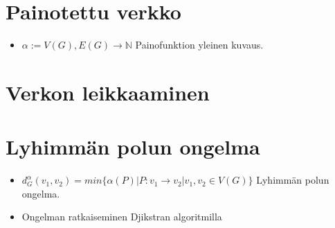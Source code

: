 \begin{itemize}
  \end{itemize}

\section{Painotettu verkko} \label{ch:09_painotettu_verkko}

  \begin{itemize}
    \item \(\alpha := V(G), E(G) \rightarrow \mathbb{N}\) Painofunktion yleinen kuvaus.
  \end{itemize}

\section{Verkon leikkaaminen} \label{ch:09_verkon_leikkaaminen}


\section{Lyhimmän polun ongelma} \label{ch:09_lyhimman_polun_ongelma}

  \begin{itemize}
    \item \(d_G^\alpha(v_1, v_2) = min\{\alpha(P) | P:v_1 \rightarrow v_2 | v_1, v_2 \in V(G)\}\) Lyhimmän polun ongelma.
    \item Ongelman ratkaiseminen Djikstran algoritmilla
  \end{itemize}
